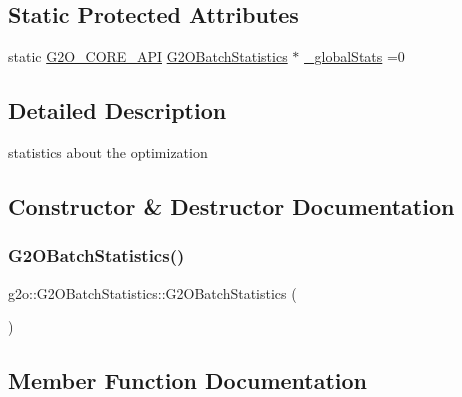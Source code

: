 \subsection*{Static Protected Attributes}
\begin{DoxyCompactItemize}
\item 
static \mbox{\hyperlink{g2o__core__api_8h_a7a8d7648d6f1e26632566f335751d064}{G2\+O\+\_\+\+C\+O\+R\+E\+\_\+\+A\+PI}} \mbox{\hyperlink{structg2o_1_1_g2_o_batch_statistics}{G2\+O\+Batch\+Statistics}} $\ast$ \mbox{\hyperlink{structg2o_1_1_g2_o_batch_statistics_ab2afc355eadf0e686507ff621f60d3eb}{\+\_\+global\+Stats}} =0
\end{DoxyCompactItemize}


\subsection{Detailed Description}
statistics about the optimization 

\subsection{Constructor \& Destructor Documentation}
\mbox{\label{structg2o_1_1_g2_o_batch_statistics_a99b348cf1d6a913ab6683c44b36a8c55}} 
\subsubsection{\texorpdfstring{G2\+O\+Batch\+Statistics()}{G2OBatchStatistics()}}
{\footnotesize\ttfamily g2o\+::\+G2\+O\+Batch\+Statistics\+::\+G2\+O\+Batch\+Statistics (\begin{DoxyParamCaption}{ }\end{DoxyParamCaption})}



\subsection{Member Function Documentation}
\mbox{\label{structg2o_1_1_g2_o_batch_statistics_a85d57b829bde666635a26d52e17f20b5}} 
